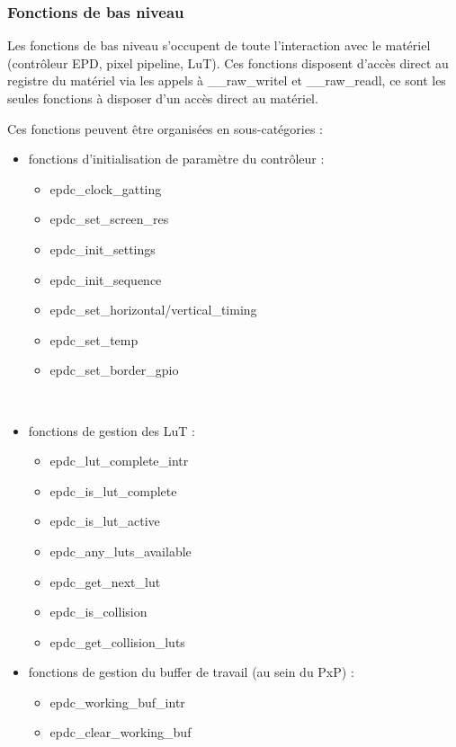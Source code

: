 \subsubsection{Fonctions de bas niveau}

Les fonctions de bas niveau s'occupent de toute l'interaction avec le matériel (contrôleur EPD, pixel pipeline, LuT).
Ces fonctions disposent d'accès direct au registre du matériel via les appels à \_\_raw\_writel et \_\_raw\_readl, ce sont les seules fonctions à disposer d'un accès direct au matériel.


Ces fonctions peuvent être organisées en sous-catégories : 

\begin{itemize}
\renewcommand{\labelitemi}{$\bullet$}
	\item fonctions d'initialisation de paramètre du contrôleur : 
		\begin{itemize}
		\renewcommand{\labelitemi}{$\to$}
			\item epdc\_clock\_gatting
			\item epdc\_set\_screen\_res
			\item epdc\_init\_settings
			\item epdc\_init\_sequence
			\item epdc\_set\_horizontal/vertical\_timing
			\item epdc\_set\_temp
			\item epdc\_set\_border\_gpio
		\end{itemize}
		~\\
	\item fonctions de gestion des LuT : 
		\begin{itemize}
			\item epdc\_lut\_complete\_intr
			\item epdc\_is\_lut\_complete
			\item epdc\_is\_lut\_active
			\item epdc\_any\_luts\_available
			\item epdc\_get\_next\_lut
			\item epdc\_is\_collision
			\item epdc\_get\_collision\_luts
		\end{itemize}
	\item fonctions de gestion du buffer de travail (au sein du PxP) : 
		\begin{itemize}
			\item epdc\_working\_buf\_intr
			\item epdc\_clear\_working\_buf

\end{itemize}
\end{itemize}
